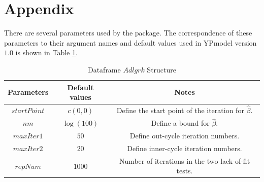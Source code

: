 \documentclass[12pt]{article}
\begin{document}
\section{Appendix}

There are several parameters used by the package.
The correspondence of these parameters to their argument names and default values used
in YPmodel version $1.0$ is shown in Table \ref{Tab:Appendix}.

\begin{table}[!h]
\renewcommand{\arraystretch}{1.3}
\caption{Dataframe $Adlgrk$ Structure} \label{Tab:Appendix} \centering
\begin{tabular}{|c||c|c|}
  \hline
  Parameters & Default values & Notes  \\
  \hline
  $startPoint$ & $c(0,0)$ & Define the start point of the iteration for $\hat{\beta}$. \\
  $nm$ & $\log(100)$ & Define a bound for $\hat{\beta}$. \\
  $maxIter1$ & $50$ & Define out-cycle iteration numbers. \\
  $maxIter2$ & $20$ & Define inner-cycle iteration numbers. \\
  $repNum$ & $1000$ & Number of iterations in the two lack-of-fit tests. \\
  \hline
\end{tabular}
\end{table}





\end{document}

